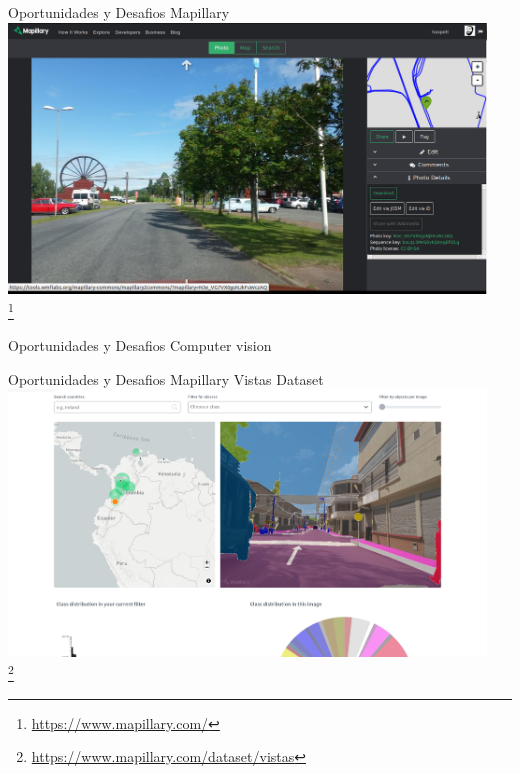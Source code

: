\documentclass{beamer}
\newcommand\blfootnote[1]{%
  \begingroup
  \renewcommand\thefootnote{}\footnote{#1}%
  \addtocounter{footnote}{-1}%
  \endgroup
}
\begin{document}
\begin{frame}{Oportunidades y Desafios}
    Mapillary \\
    \centering
    \includegraphics[width=0.95\textwidth]{figures/mapillary}\\
    \blfootnote{\url{https://www.mapillary.com/}}
\end{frame}
\begin{frame}{Oportunidades y Desafios}
    Computer vision \\
    \centering
\end{frame}
\begin{frame}{Oportunidades y Desafios}
    Mapillary Vistas Dataset \\
    \centering
    \includegraphics[width=0.95\textwidth]{figures/vistas}\\
    \blfootnote{\url{https://www.mapillary.com/dataset/vistas}}
\end{frame}
\end{document}
